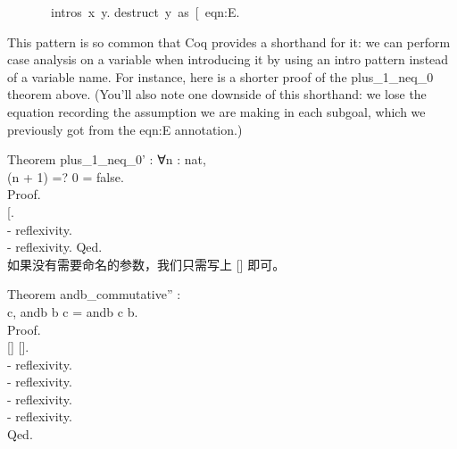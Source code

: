 \documentclass[utf8]{ctexart}
\begin{document}
~~~~~~~{intros}~{x}~{y}.
{destruct}~{y}~{as}~{[}\textbar{}{y}{]}~{eqn}:{E}.

This pattern is so common that Coq provides a shorthand for it: we can
perform case analysis on a variable when introducing it by using an
intro pattern instead of a variable name. For instance, here is a
shorter proof of the {{plus\_1\_neq\_0}} theorem above. (You'll also
note one downside of this shorthand: we lose the equation recording the
assumption we are making in each subgoal, which we previously got from
the {{eqn}:{E}} annotation.)

{Theorem} {plus\_1\_neq\_0'} : {∀}{n} : {nat},\\
\hspace*{0.333em}\hspace*{0.333em}({n} + 1) =? 0 = {false}.\\
{Proof}.\\
\hspace*{0.333em}\hspace*{0.333em}{intros} {[}\textbar{}{n}{]}.\\
\hspace*{0.333em}\hspace*{0.333em}- {reflexivity}.\\
\hspace*{0.333em}\hspace*{0.333em}- {reflexivity}. {Qed}.\\

如果没有需要命名的参数，我们只需写上 {{[}{]}} 即可。

{Theorem} {andb\_commutative''} :\\
\hspace*{0.333em} {c}, {andb} {b} {c} = {andb}
{c} {b}.\\
{Proof}.\\
\hspace*{0.333em}\hspace*{0.333em}{intros} {[}{]} {[}{]}.\\
\hspace*{0.333em}\hspace*{0.333em}- {reflexivity}.\\
\hspace*{0.333em}\hspace*{0.333em}- {reflexivity}.\\
\hspace*{0.333em}\hspace*{0.333em}- {reflexivity}.\\
\hspace*{0.333em}\hspace*{0.333em}- {reflexivity}.\\
{Qed}.\\
\end{document}
